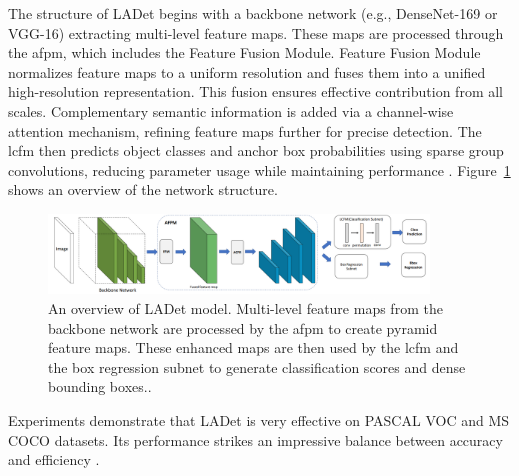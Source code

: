 \begin{enumerate}
     The structure of LADet begins with a backbone network (e.g., DenseNet-169 or VGG-16) extracting multi-level feature maps. These maps are processed through the \gls{afpm}, which includes the Feature Fusion Module. Feature Fusion Module normalizes feature maps to a uniform resolution and fuses them into a unified high-resolution representation. This fusion ensures effective contribution from all scales. Complementary semantic information is added via a channel-wise attention mechanism, refining feature maps further for precise detection. The \gls{lcfm} then predicts object classes and anchor box probabilities using sparse group convolutions, reducing parameter usage while maintaining performance \cite{LADet}. Figure~\ref{LADet} shows an overview of the network structure.

     \begin{figure}[!ht]
        \centering
        \includegraphics[width=0.9\textwidth]{Figures/LADet.PNG} 
        \caption{An overview of LADet model. Multi-level feature maps from the backbone network are processed by the \gls{afpm} to create pyramid feature maps. These enhanced maps are then used by the \gls{lcfm} and the box regression subnet to generate classification scores and dense bounding boxes.\cite{LADet}.}
        \label{LADet}
    \end{figure}

     Experiments demonstrate that LADet is very effective on PASCAL VOC and MS COCO datasets. Its performance strikes an impressive balance between accuracy and efficiency \cite{LADet}.

\end{enumerate}

